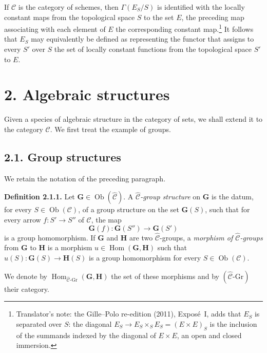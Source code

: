 If \(\mathscr C\) is the category of schemes, then
\(\Gamma(E_S/S)\) is identified with the locally constant maps from the
topological space \(S\) to the set \(E\), the preceding map associating with
each element of \(E\) the corresponding constant map.\footnote{Translator's note: the Gille--Polo re-edition (2011), Exposé~I, adds that
\(E_S\) is separated over \(S\): the diagonal
\(E_S\to E_S\times_SE_S=(E\times E)_S\) is the inclusion of the summands
indexed by the diagonal of \(E\times E\), an open and closed immersion.} It follows that
\(E_S\) may equivalently be defined as representing the functor that assigns
to every \(S'\) over \(S\) the set of locally constant functions from the
topological space \(S'\) to \(E\).

\section*{2. Algebraic structures}

Given a species of algebraic structure in the category of sets, we shall
extend it to the category \(\mathscr C\). We first treat the example of
groups.

\subsection*{2.1. Group structures}

We retain the notation of the preceding paragraph.

\medskip
\noindent{}\textbf{Definition 2.1.1.}
Let \(\mathbf G\in\operatorname{Ob}(\widehat{\mathscr C})\). A
\emph{\(\widehat{\mathscr C}\)-group structure} on \(\mathbf G\) is the
datum, for every \(S\in\operatorname{Ob}(\mathscr C)\), of a group structure
on the set \(\mathbf G(S)\), such that for every arrow
\(f:S'\to S''\) of \(\mathscr C\), the map
\[
  \mathbf G(f):\mathbf G(S'')\longrightarrow\mathbf G(S')
\]
is a group homomorphism. If \(\mathbf G\) and \(\mathbf H\) are two
\(\widehat{\mathscr C}\)-groups, a \emph{morphism of
\(\widehat{\mathscr C}\)-groups} from \(\mathbf G\) to \(\mathbf H\) is a
morphism \(u\in\operatorname{Hom}(\mathbf G,\mathbf H)\) such that
\(u(S):\mathbf G(S)\to\mathbf H(S)\) is a group homomorphism for every
\(S\in\operatorname{Ob}(\mathscr C)\).

We denote by
\(\operatorname{Hom}_{\widehat{\mathscr C}\text{-}\mathrm{Gr}}
  (\mathbf G,\mathbf H)\)
the set of these morphisms and by
\((\widehat{\mathscr C}\text{-}\mathrm{Gr})\) their category.

